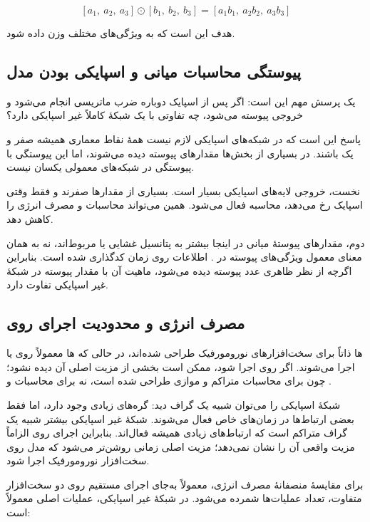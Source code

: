\[
[a_1,\ a_2,\ a_3] \odot [b_1,\ b_2,\ b_3]
=
[a_1b_1,\ a_2b_2,\ a_3b_3]
\]

هدف این است که به ویژگی‌های مختلف وزن داده شود.

\subsection{پیوستگی محاسبات میانی و اسپایکی بودن مدل}
یک پرسش مهم این است: اگر پس از اسپایک دوباره ضرب ماتریسی انجام می‌شود و خروجی پیوسته می‌شود، چه تفاوتی با یک شبکهٔ کاملاً غیر اسپایکی دارد؟

پاسخ این است که در شبکه‌های اسپایکی لازم نیست همهٔ نقاط معماری همیشه صفر و یک باشند. در بسیاری از بخش‌ها مقدارهای پیوسته دیده می‌شوند، اما این پیوستگی با پیوستگی در شبکه‌های معمولی یکسان نیست.

نخست، خروجی لایه‌های اسپایکی بسیار  است. بسیاری از مقدارها صفرند و فقط وقتی اسپایک رخ می‌دهد، محاسبه فعال می‌شود. همین  می‌تواند محاسبات و مصرف انرژی را کاهش دهد.

دوم، مقدارهای پیوستهٔ میانی در اینجا بیشتر به پتانسیل غشایی یا  مربوط‌اند، نه به همان معنای معمول ویژگی‌های پیوسته در . اطلاعات روی زمان کدگذاری شده است. بنابراین اگرچه از نظر ظاهری عدد پیوسته دیده می‌شود، ماهیت آن با مقدار پیوسته در شبکهٔ غیر اسپایکی تفاوت دارد.

\subsection{مصرف انرژی و محدودیت اجرای  روی }
ها ذاتاً برای سخت‌افزارهای نورومورفیک طراحی شده‌اند، در حالی که ها معمولاً روی  یا  اجرا می‌شوند. اگر  روی  اجرا شود، ممکن است بخشی از مزیت اصلی آن دیده نشود؛ چون  برای محاسبات متراکم و موازی طراحی شده است، نه برای محاسبات  و .

شبکهٔ اسپایکی را می‌توان شبیه یک گراف  دید: گره‌های زیادی وجود دارد، اما فقط بعضی ارتباط‌ها در زمان‌های خاص فعال می‌شوند. شبکهٔ غیر اسپایکی بیشتر شبیه یک گراف متراکم است که ارتباط‌های زیادی همیشه فعال‌اند. بنابراین اجرای  روی  الزاماً مزیت واقعی آن را نشان نمی‌دهد؛ مزیت اصلی زمانی روشن‌تر می‌شود که مدل روی سخت‌افزار نورومورفیک اجرا شود.

برای مقایسهٔ منصفانهٔ مصرف انرژی، معمولاً به‌جای اجرای مستقیم روی دو سخت‌افزار متفاوت، تعداد عملیات‌ها شمرده می‌شود. در شبکهٔ غیر اسپایکی، عملیات اصلی معمولاً  است:


